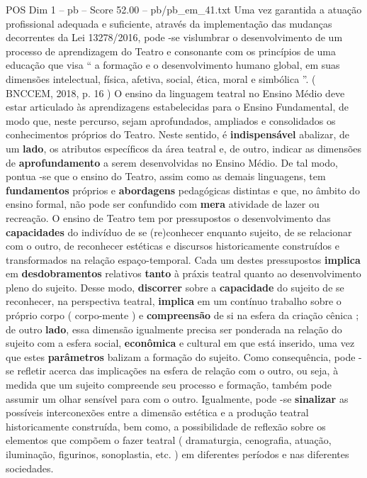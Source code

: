 \begin{textsample}{POS Dim 1 – pb – Score 52.00 – pb/pb\_em\_41.txt}
Uma vez garantida a atuação profissional adequada e suficiente, através da implementação das mudanças decorrentes da Lei 13278/2016, pode -se vislumbrar o desenvolvimento de um processo de aprendizagem do Teatro e consonante com os princípios de uma educação que visa “ a formação e o desenvolvimento humano global, em suas dimensões intelectual, física, afetiva, social, ética, moral e simbólica ”. ( BNCCEM, 2018, p. 16 ) O ensino da linguagem teatral no Ensino Médio deve estar articulado às aprendizagens estabelecidas para o Ensino Fundamental, de modo que, neste percurso, sejam aprofundados, ampliados e consolidados os conhecimentos próprios do Teatro.
Neste sentido, é \textbf{indispensável} abalizar, de um \textbf{lado}, os atributos específicos da área teatral e, de outro, indicar as dimensões de \textbf{aprofundamento} a serem desenvolvidas no Ensino Médio.
De tal modo, pontua -se que o ensino do Teatro, assim como as demais linguagens, tem \textbf{fundamentos} próprios e \textbf{abordagens} pedagógicas distintas e que, no âmbito do ensino formal, não pode ser confundido com \textbf{mera} atividade de lazer ou recreação.
O ensino de Teatro tem por pressupostos o desenvolvimento das \textbf{capacidades} do indivíduo de se (re)conhecer enquanto sujeito, de se relacionar com o outro, de reconhecer estéticas e discursos historicamente construídos e transformados na relação espaço-temporal.
Cada um destes pressupostos \textbf{implica} em \textbf{desdobramentos} relativos \textbf{tanto} à práxis teatral quanto ao desenvolvimento pleno do sujeito.
Desse modo, \textbf{discorrer} sobre a \textbf{capacidade} do sujeito de se reconhecer, na perspectiva teatral, \textbf{implica} em um contínuo trabalho sobre o próprio corpo ( corpo-mente ) e \textbf{compreensão} de si na esfera da criação cênica ; de outro \textbf{lado}, essa dimensão igualmente precisa ser ponderada na relação do sujeito com a esfera social, \textbf{econômica} e cultural em que está inserido, uma vez que estes \textbf{parâmetros} balizam a formação do sujeito.
Como consequência, pode -se refletir acerca das implicações na esfera de relação com o outro, ou seja, à medida que um sujeito compreende seu processo e formação, também pode assumir um olhar sensível para com o outro.
Igualmente, pode -se \textbf{sinalizar} as possíveis interconexões entre a dimensão estética e a produção teatral historicamente construída, bem como, a possibilidade de reflexão sobre os elementos que compõem o fazer teatral ( dramaturgia, cenografia, atuação, iluminação, figurinos, sonoplastia, etc. ) em diferentes períodos e nas diferentes sociedades.

\end{textsample}
